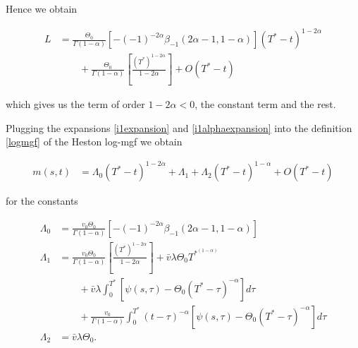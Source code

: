 \documentclass[12pt]{article}
\theoremstyle{plain}
\begin{document}
Hence we obtain

$$
\begin{aligned}
L &= \frac{\Theta_0}{\Gamma(1-\alpha)} \left[
-(-1)^{-2\alpha} \beta_{-1}(2 \alpha-1,1-\alpha)\right] (T^*-t)^{1-2\alpha}\\[10pt]
&\qquad+\frac{\Theta_0}{\Gamma(1-\alpha)} \left[
\frac{(T^*)^{1-2\alpha}}{1-2\alpha}\right] + O(T^*-t)
\end{aligned}
$$

which gives us the term of order $1-2\alpha < 0$, the constant term and the rest.

Plugging the expansions \eqref{i1expansion} and \eqref{i1alphaexpansion} into the definition \eqref{logmgf} of the Heston log-mgf we obtain

\begin{equation}\label{logmgfexpansion}
\begin{aligned}
m(s, t) &= \Lambda_0 (T^*-t)^{1-2\alpha}
+ \Lambda_1 + \Lambda_2 (T^*-t)^{1-\alpha} + O(T^*-t)
\end{aligned}
\end{equation}

for the constants

$$
\begin{aligned}
\Lambda_0 &= \frac{v_0 \Theta_0}{\Gamma(1-\alpha)} \left[
-(-1)^{-2\alpha} \beta_{-1}(2 \alpha-1,1-\alpha)\right]\\[10pt]
\Lambda_1 &= \frac{v_0\Theta_0}{\Gamma(1-\alpha)} \left[
\frac{(T^*)^{1-2\alpha}}{1-2\alpha}\right]+ \bar v \lambda\Theta_0 T^{*}^{(1-\alpha)}\\
&\qquad + \bar v \lambda \int _0^{T^*} \left[\psi(s,\tau)  - \Theta_0(T^*-\tau)^{-\alpha}\right] d\tau \\
&\qquad +  \frac{v_0}{\Gamma(1-\alpha)} \int _0^{T^*}(t-\tau)^{-\alpha}\left[\psi(s,\tau) - \Theta_0(T^*-\tau)^{-\alpha} \right] d\tau \\[10pt]
\Lambda_2 &= \bar v \lambda \Theta_0.
\end{aligned}
$$
\end{document}
